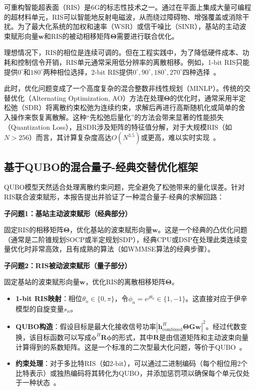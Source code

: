 \documentclass[12pt,a4paper]{article}
\newcommand{\bw}{\mathbf{w}}
\newcommand{\bR}{\mathbf{R}}
\newcommand{\bTheta}{\boldsymbol{\Theta}}
\newcommand{\bphi}{\boldsymbol{\phi}}
\begin{document}
可重构智能超表面（RIS）是6G的标志性技术之一。通过在平面上集成大量可编程的超材料单元，RIS可以智能地反射电磁波，从而绕过障碍物、增强覆盖或消除干扰。为了最大化系统的加权和速率（WSR）或信干噪比（SINR），基站的主动波束赋形向量$\bw$和RIS的被动相移矩阵$\bTheta$需要进行联合优化。

理想情况下，RIS的相位是连续可调的。但在工程实践中，为了降低硬件成本、功耗和控制信令开销，RIS单元通常采用低分辨率的离散相移。例如，1-bit RIS只能提供$0^\circ$和$180^\circ$两种相位选择，2-bit RIS提供$0^\circ, 90^\circ, 180^\circ, 270^\circ$四种选择~\cite{ref8}。

此时，优化问题变成了一个高度复杂的混合整数非线性规划（MINLP）。传统的交替优化（Alternating Optimization, AO）方法在处理$\bTheta$的优化时，通常采用半定松弛（SDR）将离散约束松弛为连续约束，求解后再进行高斯随机化或简单的舍入操作来恢复离散解。这种``先松弛后量化''的方法会带来显著的性能损失（Quantization Loss），且SDR涉及矩阵的特征值分解，对于大规模RIS（如$N > 256$）而言，其计算复杂度高达$O(N^{3.5})$或更高，难以实时实现~\cite{ref32}。

\subsection{基于QUBO的混合量子-经典交替优化框架}

QUBO模型天然适合处理离散约束问题，完全避免了松弛带来的量化误差。针对RIS联合波束赋形，本报告提出并验证了一种混合量子-经典的求解回路：

\textbf{子问题1：基站主动波束赋形（经典部分）}

固定RIS的相移矩阵$\bTheta$，优化基站的波束赋形向量$\bw$。这是一个经典的凸优化问题（通常是二阶锥规划SOCP或半定规划SDP），经典CPU或DSP在处理此类连续变量优化时非常高效，且有成熟的算法（如WMMSE算法的经典步骤）。

\textbf{子问题2：RIS被动波束赋形（量子部分）}

固定基站的波束赋形向量$\bw$，优化RIS的离散相移矩阵$\bTheta$。

\begin{itemize}
    \item \textbf{1-bit RIS映射}：相位$\theta_n \in \{0, \pi\}$，令$\phi_n = e^{j\theta_n} \in \{1, -1\}$。这直接对应于伊辛模型的自旋变量$s_n$。
    \item \textbf{QUBO构造}：假设目标是最大化接收信号功率$|\mathbf{h}_{\text{combined}}^H \bTheta \mathbf{G} \bw|^2$。经过代数变换，该目标函数可以写成$\bphi^H \bR \bphi$的形式，其中$\bR$是由信道矩阵和主动波束向量计算得到的系数矩阵。这是一个标准的二次型最大化问题，等价于QUBO~\cite{ref34}。
    \item \textbf{约束处理}：对于多比特RIS（如2-bit），可以通过二进制编码（每个相位用2个比特表示）或独热编码将其转化为QUBO，并添加惩罚项以确保每个单元仅处于一种状态~\cite{ref18}。
\end{itemize}
\end{document}
